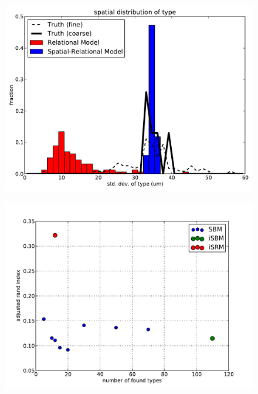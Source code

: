 \documentclass{article}
\begin{document}
\begin{figure}[h!]
  \centering 
    \centerline{\includegraphics[width=5in]{mouseretina/spatial_var.pdf}}
  \caption{}
\label{fig:supp:irmspatialcomparemouse}
\end{figure}

\begin{figure}[h!]
  \centering 
    \centerline{\includegraphics[width=5in]{mouseretina/ari_vs_cluster.pdf}}
  \caption{}
\label{fig:supp:mousecompareari}
\end{figure}
\end{document}
